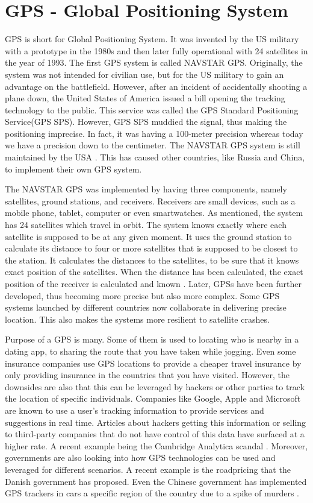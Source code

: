 \section{GPS - Global Positioning System}
GPS is short for Global Positioning System. It was invented by the US military with a prototype in the 1980s and then later fully operational with 24 satellites in the year of 1993. The first GPS system is called NAVSTAR GPS. Originally, the system was not intended for civilian use, but for the US military to gain an advantage on the battlefield. However, after an incident of accidentally shooting a plane down, the United States of America issued a bill opening the tracking technology to the public. This service was called the GPS Standard Positioning Service(GPS SPS). However, GPS SPS muddied the signal, thus making the positioning imprecise. In fact, it was having a 100-meter precision whereas today we have a precision down to the centimeter. The NAVSTAR GPS system is still maintained by the USA \cite{wiki:gps}. This has caused other countries, like Russia and China, to implement their own GPS system.

The NAVSTAR GPS was implemented by having three components, namely satellites, ground stations, and receivers. Receivers are small devices, such as a mobile phone, tablet, computer or even smartwatches. As mentioned, the system has 24 satellites which travel in orbit. The system knows exactly where each satellite is supposed to be at any given moment. It uses the ground station to calculate its distance to four or more satellites that is supposed to be closest to the station. It calculates the distances to the satellites, to be sure that it knows exact position of the satellites. When the distance has been calculated, the exact position of the receiver is calculated and known \cite{nasa:gps}. Later, GPSs have been further developed, thus becoming more precise but also more complex. Some GPS systems launched by different countries now collaborate in delivering precise location. This also makes the systems more resilient to satellite crashes. 

Purpose of a GPS is many. Some of them is used to locating who is nearby in a dating app, to sharing the route that you have taken while jogging. Even some insurance companies use GPS locations to provide a cheaper travel insurance by only providing insurance in the countries that you have visited. However, the downsides are also that this can be leveraged by hackers or other parties to track the location of specific individuals. Companies like Google, Apple and Microsoft are known to use a user's tracking information to provide services and suggestions in real time. Articles about hackers getting this information or selling to third-party companies that do not have control of this data have surfaced at a higher rate. A recent example being the Cambridge Analytica scandal \cite{newyorktimes:facebook}. Moreover, governments are also looking into how GPS technologies can be used and leveraged for different scenarios. A recent example is the roadpricing that the Danish government has proposed. Even the Chinese government has implemented GPS trackers in cars a specific region of the country due to a spike of murders \cite{guardian:2017}.

